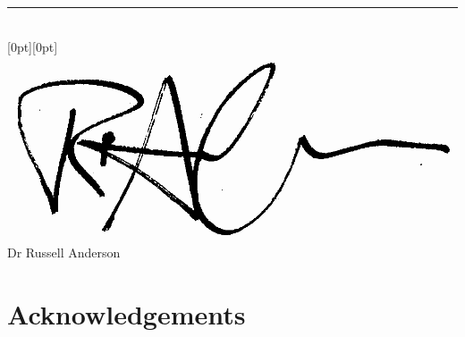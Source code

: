 \begin{center}
\vspace{1.5cm}
\rule{8cm}{1pt}\\
\raisebox{0.5cm}[0pt][0pt]{\includegraphics[scale=0.1]{submission/rpa}}\\
Dr Russell Anderson 

\end{center}

\chapter*{Acknowledgements}


\cleardoublepage

\tableofcontents
\cleardoublepage
{}
